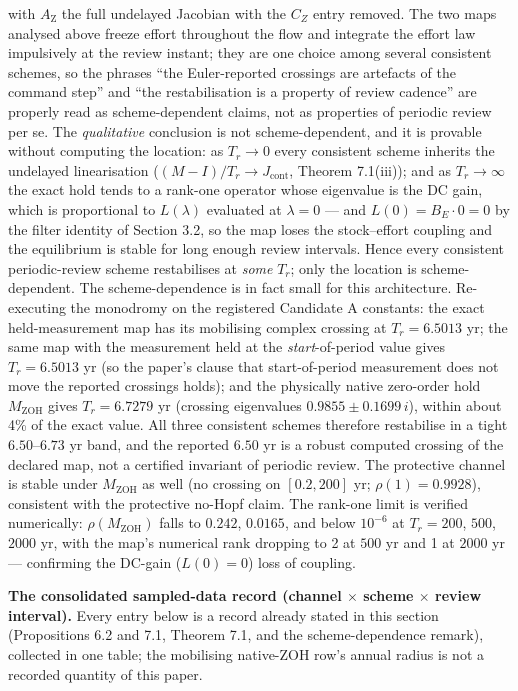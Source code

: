 \documentclass[11pt]{article}
\begin{document}
with \(A_{\mathrm{Z}}\) the full undelayed Jacobian with the \(C_Z\)
entry removed. The two maps analysed above freeze effort throughout the
flow and integrate the effort law impulsively at the review instant;
they are one choice among several consistent schemes, so the phrases
``the Euler-reported crossings are artefacts of the command step'' and
``the restabilisation is a property of review cadence'' are properly
read as scheme-dependent claims, not as properties of periodic review
per se. The \emph{qualitative} conclusion is not scheme-dependent, and
it is provable without computing the location: as \(T_r \to 0\) every
consistent scheme inherits the undelayed linearisation
(\((M - I)/T_r \to J_{\mathrm{cont}}\), Theorem 7.1(iii)); and as
\(T_r \to \infty\) the exact hold tends to a rank-one operator whose
eigenvalue is the DC gain, which is proportional to \(L(\lambda)\)
evaluated at \(\lambda = 0\) --- and \(L(0) = B_E \cdot 0 = 0\) by the
filter identity of Section 3.2, so the map loses the stock--effort
coupling and the equilibrium is stable for long enough review intervals.
Hence every consistent periodic-review scheme restabilises at
\emph{some} \(T_r\); only the location is scheme-dependent. The
scheme-dependence is in fact small for this architecture. Re-executing
the monodromy on the registered Candidate A constants: the exact
held-measurement map has its mobilising complex crossing at
\(T_r = 6.5013\) yr; the same map with the measurement held at the
\emph{start}-of-period value gives \(T_r = 6.5013\) yr (so the paper's
clause that start-of-period measurement does not move the reported
crossings holds); and the physically native zero-order hold
\(M_{\mathrm{ZOH}}\) gives \(T_r = 6.7279\) yr (crossing eigenvalues
\(0.9855 \pm 0.1699\,i\)), within about 4\% of the exact value. All
three consistent schemes therefore restabilise in a tight
\(6.50\)--\(6.73\) yr band, and the reported \(6.50\) yr is a robust
computed crossing of the declared map, not a certified invariant of
periodic review. The protective channel is stable under
\(M_{\mathrm{ZOH}}\) as well (no crossing on \([0.2, 200]\) yr;
\(\rho(1) = 0.9928\)), consistent with the protective no-Hopf claim. The
rank-one limit is verified numerically: \(\rho(M_{\mathrm{ZOH}})\) falls
to \(0.242\), \(0.0165\), and below \(10^{-6}\) at \(T_r = 200\),
\(500\), \(2000\) yr, with the map's numerical rank dropping to 2 at
\(500\) yr and 1 at \(2000\) yr --- confirming the DC-gain
(\(L(0) = 0\)) loss of coupling.

\textbf{The consolidated sampled-data record (channel \ensuremath{\times} scheme \ensuremath{\times} review
interval).} Every entry below is a record already stated in this section
(Propositions 6.2 and 7.1, Theorem 7.1, and the scheme-dependence
remark), collected in one table; the mobilising native-ZOH row's annual
radius is not a recorded quantity of this paper.
\end{document}
